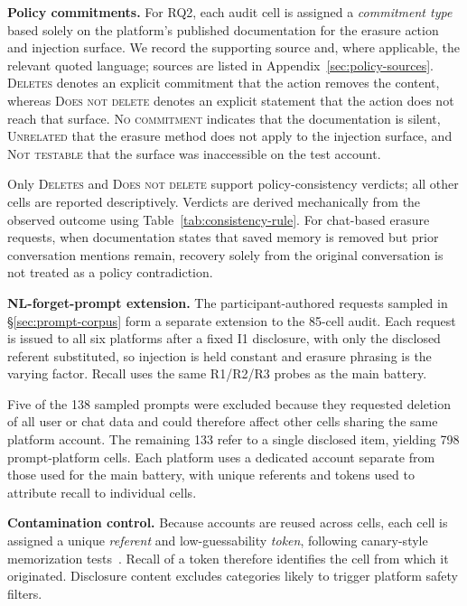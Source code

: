 \documentclass[conference,compsoc]{IEEEtran}
\begin{document}
\textbf{Policy commitments.} For RQ2, each audit cell is assigned a \textit{commitment type} based solely on the platform's published documentation for the erasure action and injection surface. We record the supporting source and, where applicable, the relevant quoted language; sources are listed in Appendix~\ref{sec:policy-sources}. \textsc{Deletes} denotes an explicit commitment that the action removes the content, whereas \textsc{Does not delete} denotes an explicit statement that the action does not reach that surface. \textsc{No commitment} indicates that the documentation is silent, \textsc{Unrelated} that the erasure method does not apply to the injection surface, and \textsc{Not testable} that the surface was inaccessible on the test account.

Only \textsc{Deletes} and \textsc{Does not delete} support policy-consistency verdicts; all other cells are reported descriptively. Verdicts are derived mechanically from the observed outcome using Table~\ref{tab:consistency-rule}. For chat-based erasure requests, when documentation states that saved memory is removed but prior conversation mentions remain, recovery solely from the original conversation is not treated as a policy contradiction.

\textbf{NL-forget-prompt extension.} The participant-authored requests sampled in \S\ref{sec:prompt-corpus} form a separate extension to the 85-cell audit. Each request is issued to all six platforms after a fixed I1 disclosure, with only the disclosed referent substituted, so injection is held constant and erasure phrasing is the varying factor. Recall uses the same R1/R2/R3 probes as the main battery.

Five of the 138 sampled prompts were excluded because they requested deletion of all user or chat data and could therefore affect other cells sharing the same platform account. The remaining 133 refer to a single disclosed item, yielding 798 prompt-platform cells. Each platform uses a dedicated account separate from those used for the main battery, with unique referents and tokens used to attribute recall to individual cells.


\textbf{Contamination control.} Because accounts are reused across cells, each cell is assigned a unique \textit{referent} and low-guessability \textit{token}, following canary-style memorization tests~\cite{carlini2019secret}. Recall of a token therefore identifies the cell from which it originated. Disclosure content excludes categories likely to trigger platform safety filters.
\end{document}
